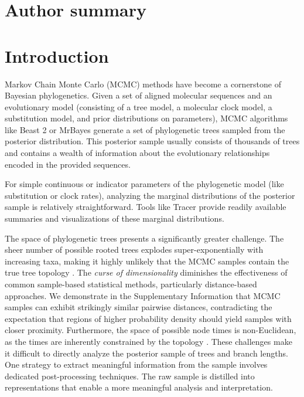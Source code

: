 \documentclass[10pt,letterpaper]{article}
\begin{document}
\section*{Author summary}


\linenumbers

\section*{Introduction}

Markov Chain Monte Carlo (MCMC) methods have become a cornerstone of Bayesian phylogenetics. Given a set of aligned molecular sequences and an evolutionary model (consisting of a tree model, a molecular clock model, a substitution model, and prior distributions on parameters), MCMC algorithms like Beast 2 \cite{beast2} or MrBayes \cite{mrbayes} generate a set of phylogenetic trees sampled from the posterior distribution. This posterior sample usually consists of thousands of trees and contains a wealth of information about the evolutionary relationships encoded in the provided sequences.

For simple continuous or indicator parameters of the phylogenetic model (like substitution or clock rates), analyzing the marginal distributions of the posterior sample is relatively straightforward. Tools like Tracer \cite{tracer} provide readily available summaries and visualizations of these marginal distributions.

The space of phylogenetic trees presents a significantly greater challenge. The sheer number of possible rooted trees explodes super-exponentially with increasing taxa, making it highly unlikely that the MCMC samples contain the true tree topology \cite{ccd}. The \emph{curse of dimensionality} \cite{curse} diminishes the effectiveness of common sample-based statistical methods, particularly distance-based approaches. We demonstrate in the Supplementary Information that MCMC samples can exhibit strikingly similar pairwise distances, contradicting the expectation that regions of higher probability density should yield samples with closer proximity. Furthermore, the space of possible node times is non-Euclidean, as the times are inherently constrained by the topology \cite{wald,tauspace,tropical,bhv}. These challenges make it difficult to directly analyze the posterior sample of trees and branch lengths. One strategy to extract meaningful information from the sample involves dedicated post-processing techniques. The raw sample is distilled into representations that enable a more meaningful analysis and interpretation.
\end{document}
